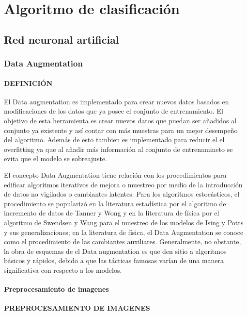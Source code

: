 \newpage
\chapter{Algoritmo de clasificación}

	\section{Red neuronal artificial}

		\subsection{Data Augmentation}
			\subsubsection{\MakeUppercase{Definición}}

			El Data augmentation es implementado para crear nuevos datos basados en modificaciones de los datos que ya posee el conjunto de entrenamiento. El objetivo de esta herramienta es crear nuevos datos que puedan ser añadidos al conjunto ya existente y así contar con más muestras para un mejor desempeño del algoritmo. Además de esto tambien es implementado para reducir el el overfitting ya que al añadir más información al conjunto de entrenamineto se evita que el modelo se sobreajuste. 


			El concepto Data Augmentation tiene relación con los procedimientos para edificar algoritmos iterativos de mejora o muestreo por medio de la introducción de datos no vigilados o cambiantes latentes. Para los algoritmos estocásticos, el procedimiento se popularizó en la literatura estadística por el algoritmo de incremento de datos de Tanner y Wong y en la literatura de física por el algoritmo de Swendsen y Wang para el muestreo de los modelos de Ising y Potts y sus generalizaciones; en la literatura de física, el Data Augmentation se conoce como el procedimiento de las cambiantes auxiliares. Generalmente, no obstante, la obra de esquemas de el Data augmentation es que den sitio a algoritmos básicos y rápidos, debido a que las tácticas famosas varían de una manera significativa con respecto a los modelos.\cite{van2001art}
			
			
			 
			
			\subsubsection{Preprocesamiento de imagenes}
			\subsubsection{\MakeUppercase{Preprocesamiento de imagenes}}

